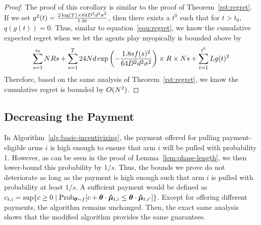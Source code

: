 \begin{proof}
The proof of this corollary is similar to the proof of Theorem~\ref{rst:regret}. If we set $g^2(t)=\frac{2\log(T)\times 64D^2 d^2\sigma^2}{1.8t}$, then there exists a $t^{0}$ such that for $t>t_{0}$, $q(g(t))=0$. Thus, similar to equation~\eqref{equ:regret}, we know the cumulative expected regret when we let the agents play myopically is bounded above by
\begin{align}
\sum_{s=1}^{s_0}N R s + \sum_{s=1}^{T} 24N d\exp\left(-\frac{1.8s f(s)^2}{64 D^2 d^2\sigma^2}\right)\times R \times N s+ \sum_{t=1}^{t^{0}}L g(t)^2 \nonumber
\end{align}
Therefore, based on the same analysis of Theorem~\ref{rst:regret}, we know the cumulative regret is bounded by $O(N^2)$.
\end{proof}

\subsection{Decreasing the Payment} \label{sec:pi}

In Algorithm~\ref{alg:basic-incentivizing},
the payment  offered for pulling payment-eligible arms $i$
is high enough to ensure that arm $i$ will be pulled with probability 1.
However, as can be seen in the proof of Lemma~\ref{lem:phase-length},
we then lower-bound this probability by $1/s$.
Thus, the bounds we prove do not deteriorate as long as the payment is
high enough such that arm $i$ is pulled with probability at least $1/s$.
A sufficient payment would be defined as
$\Pay{t}{i} = \sup \Set{c \geq 0}{%
  \Prob[\AgV \sim \AgentDist]{c + \AgV \cdot \ArmEV{t}{i} \leq \AgV \cdot \ArmEV{t}{i'}}}$.
Except for offering different payments, the algorithm remains unchanged.
Then, the exact same analysis shows that the modified algorithm
provides the same guarantees.
